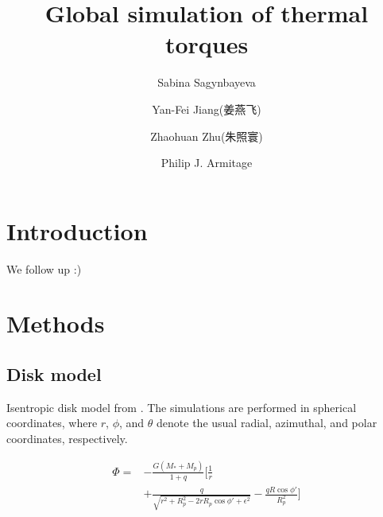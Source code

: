 \documentclass[twocolumn]{aastex631}
\begin{document}
\title{Global simulation of thermal torques}

\author[0000-0002-6650-3829]{Sabina Sagynbayeva}

\author[0000-0002-2624-3399]{Yan-Fei Jiang(姜燕飞)}

\author{Zhaohuan Zhu(朱照寰)}

\author[0000-0001-5032-1396]{Philip J. Armitage}

\begin{abstract}
   
\end{abstract}

\section{Introduction} 
\label{sec:intro}
We follow up \citet{hankla20} :)

\section{Methods}
\label{sec:methods}

\subsection{Disk model}
Isentropic disk model from \citet{Fung_2017}.
The simulations are performed in spherical coordinates, where $r$, $\phi$, and $\theta$ denote the usual radial, azimuthal, and polar coordinates, respectively. 

\begin{equation}\label{eq:potential}
\begin{aligned}
     \Phi = & -\frac{G(M_*+M_p)}{1+q} \bigg[\frac{1}{r} \\
     & + \frac{q}{\sqrt{r^2+R_p^2-2rR_p\cos{\phi'}+\epsilon^2}} - \frac{qR\cos{\phi'}}{R_p^2}\bigg] \\
\end{aligned}
\end{equation}
\end{document}

